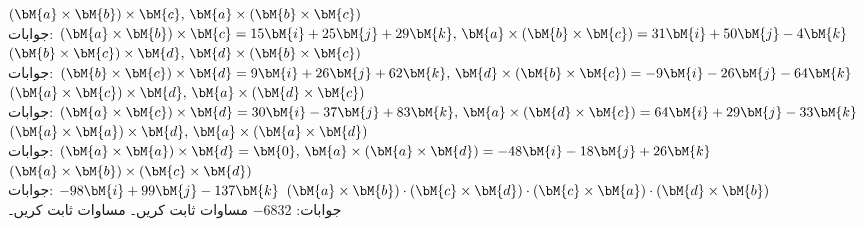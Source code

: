 \quad
$(\bM{a}\times \bM{b})\times \bM{c},\, \bM{a}\times (\bM{b}\times \bM{c})$\\
جوابات:
$(\bM{a}\times \bM{b})\times \bM{c}=15\bM{i}+25\bM{j}+29\bM{k},\,\bM{a}\times (\bM{b}\times \bM{c})=31\bM{i}+50\bM{j}-4\bM{k} $
\quad
$(\bM{b}\times \bM{c})\times \bM{d},\, \bM{d}\times (\bM{b}\times \bM{c})$\\
جوابات:
$(\bM{b}\times \bM{c})\times \bM{d}=9\bM{i}+26\bM{j}+62\bM{k},\,\bM{d}\times (\bM{b}\times \bM{c})=-9\bM{i}-26\bM{j}-64\bM{k} $
\quad
$(\bM{a}\times \bM{c})\times \bM{d},\, \bM{a}\times (\bM{d}\times \bM{c})$\\
جوابات:
$(\bM{a}\times \bM{c})\times \bM{d}=30\bM{i}-37\bM{j}+83\bM{k},\,\bM{a}\times (\bM{d}\times \bM{c})=64\bM{i}+29\bM{j}-33\bM{k} $
\quad
$(\bM{a}\times \bM{a})\times \bM{d},\, \bM{a}\times (\bM{a}\times \bM{d})$\\
جوابات:
$(\bM{a}\times \bM{a})\times \bM{d}=\bM{0},\,\bM{a}\times (\bM{a}\times \bM{d})=-48\bM{i}-18\bM{j}+26\bM{k} $
\quad
$(\bM{a}\times \bM{b})\times (\bM{c}\times \bM{d})$\\
جوابات:
$-98\bM{i}+99\bM{j}-137\bM{k} $
\quad
$(\bM{a}\times \bM{b})\cdot(\bM{c}\times \bM{d})\cdot (\bM{c}\times \bM{a})\cdot(\bM{d}\times \bM{b})$\\
جوابات:
$-6832$
مساوات  ثابت کریں۔
مساوات  ثابت کریں۔

